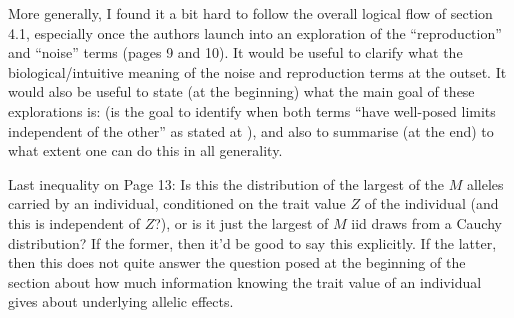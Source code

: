 
\begin{point}{}
More generally, I found it a bit hard to follow the overall logical flow of section 4.1, especially once the authors launch into an exploration of the ``reproduction'' and ``noise'' terms (pages 9 and 10).
    It would be useful to clarify what the biological/intuitive meaning of the noise and reproduction terms at the outset. It would also be useful to state (at the beginning) what the main goal of these explorations is: (is the goal to identify when both terms ``have well-posed limits independent of the other'' as stated at ), and also to summarise (at the end) to what extent one can do this in all generality.
\end{point}



\begin{point}{}
    Last inequality on Page 13: Is this the distribution of the largest of the $M$ alleles carried by an individual, conditioned on the trait value $Z$ of the individual (and this is independent of $Z$?), or is it just the largest of $M$ iid draws from a Cauchy distribution? If the former, then it'd be good to say this explicitly. If the latter, then this does not quite answer the question posed at the beginning of the section about how much information knowing the trait value of an individual gives about underlying allelic effects.
\end{point}


